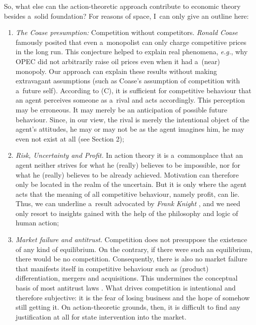 So, what else can the action-theoretic approach contribute to economic theory besides a~solid foundation? For reasons of space, I~can only give an outline here:



\begin{enumerate}

\item \textit{The Coase presumption:} Competition without competitors. \textit{Ronald Coase} 
\parencite*[][]{coase_durability_1972} %
 famously posited that even a~monopolist can only charge competitive prices in the long run. This conjecture helped to explain real phenomena, \textit{e.g.}, why OPEC did not arbitrarily raise oil prices even when it had a~(near) monopoly. Our approach can explain these results without making extravagant assumptions (such as Coase's assumption of competition with a~future self). According to (C), it is sufficient for competitive behaviour that an agent perceives someone as a~rival and acts accordingly. This perception may be erroneous. It may merely be an anticipation of possible future behaviour. Since, in our view, the rival is merely the intentional object of the agent's attitudes, he may or may not be as the agent imagines him, he may even not exist at all (see Section 2);

\item \textit{Risk, Uncertainty and Profit.} In action theory it is a~commonplace that an agent neither strives for what he (really) believes to be impossible, nor for what he (really) believes to be already achieved. Motivation can therefore only be located in the realm of the uncertain. But it is only where the agent acts that the meaning of all competitive behaviour, namely profit, can lie. Thus, we can underline a~result advocated by \textit{Frank Knight} 
\parencite*[][]{knight_risk_1921}, %
 and we need only resort to insights gained with the help of the philosophy and logic of human action;

\item \textit{Market failure and antitrust.} Competition does not presuppose the existence of any kind of equilibrium. On the contrary, if there were such an equilibrium, there would be no competition. Consequently, there is also no market failure that manifests itself in competitive behaviour such as (product) differentiation, mergers and acquisitions. This undermines the conceptual basis of most antitrust laws 
\parencite[cf.][]{armentano_myths_1972}. %
 What drives competition is intentional and therefore subjective: it is the fear of losing business and the hope of somehow still getting it. On action-theoretic grounds, then, it is difficult to find any justification at all for state intervention into the market.

\end{enumerate}

